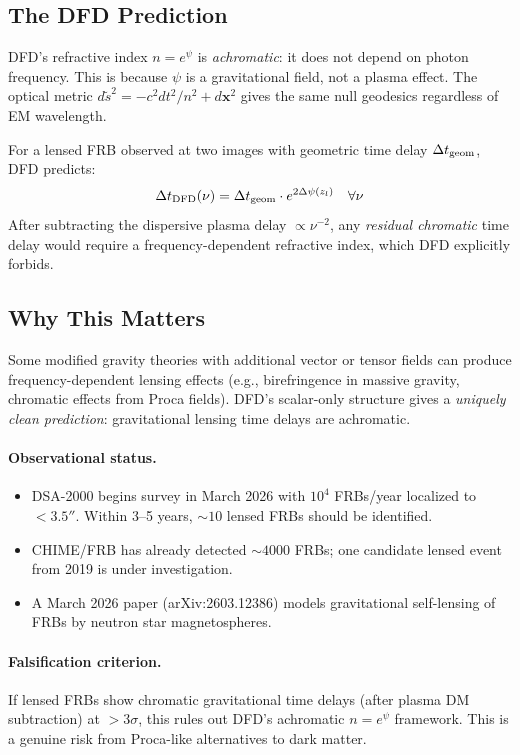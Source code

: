 \documentclass[11pt,a4paper]{article}
\newcommand{\Dpsi}{\Delta\psi}
\begin{document}
\subsection{The DFD Prediction}

DFD's refractive index $n = e^\psi$ is \emph{achromatic}: it
does not depend on photon frequency.  This is because $\psi$ is
a gravitational field, not a plasma effect.  The optical metric
$d\tilde{s}^2 = -c^2 dt^2 / n^2 + d\mathbf{x}^2$ gives the same
null geodesics regardless of EM wavelength.

For a lensed FRB observed at two images with geometric time
delay $\Delta t_{\rm geom}$, DFD predicts:
\begin{equation}
\Delta t_{\rm DFD}(\nu) = \Delta t_{\rm geom} \cdot e^{2\Dpsi(z_l)}
\quad \forall \nu
\end{equation}
After subtracting the dispersive plasma delay $\propto \nu^{-2}$,
any \emph{residual chromatic} time delay would require a
frequency-dependent refractive index, which DFD explicitly
forbids.

\subsection{Why This Matters}

Some modified gravity theories with additional vector or tensor
fields can produce frequency-dependent lensing effects (e.g.,
birefringence in massive gravity, chromatic effects from
Proca fields).  DFD's scalar-only structure gives a
\emph{uniquely clean prediction}: gravitational lensing
time delays are achromatic.

\paragraph{Observational status.}
\begin{itemize}
\item DSA-2000 begins survey in March 2026 with $10^4$
  FRBs/year localized to $< 3.5''$.  Within 3--5 years,
  $\sim 10$ lensed FRBs should be identified.
\item CHIME/FRB has already detected $\sim 4000$ FRBs; one
  candidate lensed event from 2019 is under investigation.
\item A March 2026 paper (arXiv:2603.12386) models gravitational
  self-lensing of FRBs by neutron star magnetospheres.
\end{itemize}

\paragraph{Falsification criterion.}
If lensed FRBs show chromatic gravitational time delays
(after plasma DM subtraction) at $> 3\sigma$, this rules
out DFD's achromatic $n = e^\psi$ framework.  This is a
genuine risk from Proca-like alternatives to dark matter.
\end{document}
